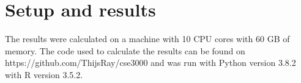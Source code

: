 \section{Setup and results}
The results were calculated on a machine with 10 CPU cores with 60 GB of 
memory. The code used to calculate the results can be found on
https://github.com/ThijsRay/cse3000 and was run with Python version 3.8.2
with R version 3.5.2.
